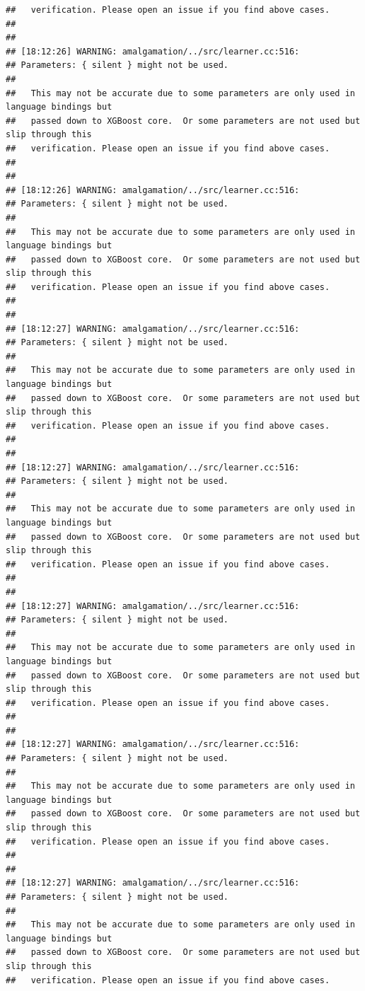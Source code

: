 \documentclass[AMS,STIX2COL]{WileyNJD-v2}\usepackage[]{graphicx}\usepackage[]{color}
\makeatletter
\newenvironment{kframe}{%
 \def\at@end@of@kframe{}%
 \ifinner\ifhmode%
  \def\at@end@of@kframe{\end{minipage}}%
  \begin{minipage}{\columnwidth}%
 \fi\fi%
 \def\FrameCommand##1{\hskip\@totalleftmargin \hskip-\fboxsep
 \colorbox{shadecolor}{##1}\hskip-\fboxsep
     \hskip-\linewidth \hskip-\@totalleftmargin \hskip\columnwidth}%
 \MakeFramed {\advance\hsize-\width
   \@totalleftmargin\z@ \linewidth\hsize
   \@setminipage}}%
 {\par\unskip\endMakeFramed%
 \at@end@of@kframe}
\newenvironment{knitrout}{}{} %
\makeatother
\begin{document}
\begin{knitrout}
\begin{kframe}
\begin{verbatim}
##   verification. Please open an issue if you find above cases.
## 
## 
## [18:12:26] WARNING: amalgamation/../src/learner.cc:516: 
## Parameters: { silent } might not be used.
## 
##   This may not be accurate due to some parameters are only used in language bindings but
##   passed down to XGBoost core.  Or some parameters are not used but slip through this
##   verification. Please open an issue if you find above cases.
## 
## 
## [18:12:26] WARNING: amalgamation/../src/learner.cc:516: 
## Parameters: { silent } might not be used.
## 
##   This may not be accurate due to some parameters are only used in language bindings but
##   passed down to XGBoost core.  Or some parameters are not used but slip through this
##   verification. Please open an issue if you find above cases.
## 
## 
## [18:12:27] WARNING: amalgamation/../src/learner.cc:516: 
## Parameters: { silent } might not be used.
## 
##   This may not be accurate due to some parameters are only used in language bindings but
##   passed down to XGBoost core.  Or some parameters are not used but slip through this
##   verification. Please open an issue if you find above cases.
## 
## 
## [18:12:27] WARNING: amalgamation/../src/learner.cc:516: 
## Parameters: { silent } might not be used.
## 
##   This may not be accurate due to some parameters are only used in language bindings but
##   passed down to XGBoost core.  Or some parameters are not used but slip through this
##   verification. Please open an issue if you find above cases.
## 
## 
## [18:12:27] WARNING: amalgamation/../src/learner.cc:516: 
## Parameters: { silent } might not be used.
## 
##   This may not be accurate due to some parameters are only used in language bindings but
##   passed down to XGBoost core.  Or some parameters are not used but slip through this
##   verification. Please open an issue if you find above cases.
## 
## 
## [18:12:27] WARNING: amalgamation/../src/learner.cc:516: 
## Parameters: { silent } might not be used.
## 
##   This may not be accurate due to some parameters are only used in language bindings but
##   passed down to XGBoost core.  Or some parameters are not used but slip through this
##   verification. Please open an issue if you find above cases.
## 
## 
## [18:12:27] WARNING: amalgamation/../src/learner.cc:516: 
## Parameters: { silent } might not be used.
## 
##   This may not be accurate due to some parameters are only used in language bindings but
##   passed down to XGBoost core.  Or some parameters are not used but slip through this
##   verification. Please open an issue if you find above cases.

\end{verbatim}
\end{kframe}
\end{knitrout}
\end{document}
